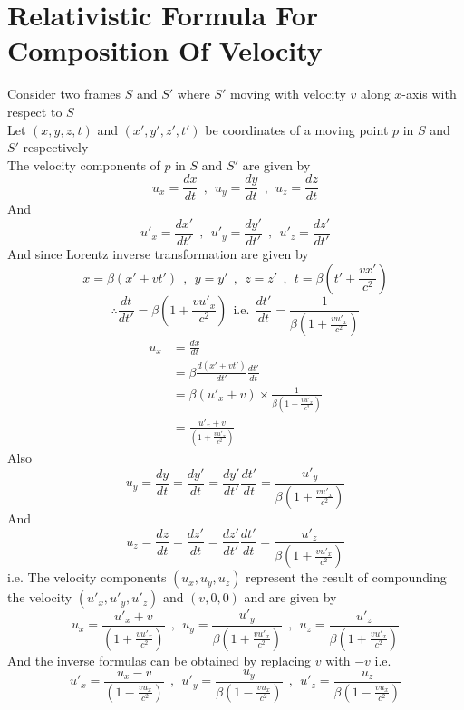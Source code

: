 \newpage
\section{Relativistic Formula For Composition Of Velocity}
Consider two frames $S$ and $S'$ where $S'$ moving with velocity $v$ along $x$-axis
with respect to $S$\\
Let $(x,y,z,t)$ and $(x',y',z',t')$ be coordinates of a moving point $p$ in $S$ and $S'$ respectively\\
The velocity components of $p$ in $S$ and $S'$ are given by 
\[
u_x = \frac{dx}{dt} \ \ , \ \  u_y = \frac{dy}{dt} \ \ , \ \  u_z = \frac{dz}{dt}
\]
And 
\[
    u'_x = \frac{dx'}{dt'} \ \ , \ \  u'_y = \frac{dy'}{dt'} \ \ , \ \  u'_z = \frac{dz'}{dt'}
\]
And since Lorentz inverse transformation are given by 
\[
x= \beta(x'+vt') \ \ , \ \ y = y' \ \ , \ \ z = z' \ \ , \ \ t =\beta\left(t' + \frac{vx'}{c^2}\right)
\]
\[
    \therefore \frac{dt}{dt'} = \beta\left(1 + \frac{vu'_x}{c^2}\right) \ \ \text{i.e.} \ \ \frac{dt'}{dt} = \frac{1}{\beta\left(1 + \frac{vu'_x}{c^2}\right)}
\]
\begin{align*}
    u_x &= \frac{dx}{dt}\\
        &= \beta\frac{d(x'+vt')}{dt'} \frac{dt'}{dt}\\
        &= \beta(u'_x + v) \times \frac{1}{\beta\left(1 + \frac{vu'_x}{c^2}\right)}\\
        &= \frac{u'_x + v}{\left(1 + \frac{vu'_x}{c^2}\right)}
\end{align*}
Also
\[
u_y = \frac{dy}{dt} = \frac{dy'}{dt} = \frac{dy'}{dt'}\frac{dt'}{dt} = \frac{u'_y}{\beta\left(1 + \frac{vu'_x}{c^2}\right)}
\]
And
\[
u_z = \frac{dz}{dt} = \frac{dz'}{dt} = \frac{dz'}{dt'}\frac{dt'}{dt} = \frac{u'_z}{\beta\left(1 + \frac{vu'_x}{c^2}\right)}
\]
i.e. The velocity components $(u_x,u_y,u_z)$ represent the result of compounding the velocity $(u'_x,u'_y,u'_z)$ and $(v,0,0)$ and are given by 
\[
    u_x = \frac{u'_x + v}{\left(1 + \frac{vu'_x}{c^2}\right)}
    \ \ , \ \ 
    u_y = \frac{u'_y}{\beta\left(1 + \frac{vu'_x}{c^2}\right)}
    \ \ , \ \ 
    u_z = \frac{u'_z}{\beta\left(1 + \frac{vu'_x}{c^2}\right)}
\]
And the inverse formulas can be obtained by replacing $v$ with $-v$ i.e.
\[
    u'_x = \frac{u_x - v}{\left(1 - \frac{vu_x}{c^2}\right)}
    \ \ , \ \ 
    u'_y = \frac{u_y}{\beta\left(1 - \frac{vu_x}{c^2}\right)}
    \ \ , \ \ 
    u'_z = \frac{u_z}{\beta\left(1 - \frac{vu_x}{c^2}\right)}
\]
\pagebreak
